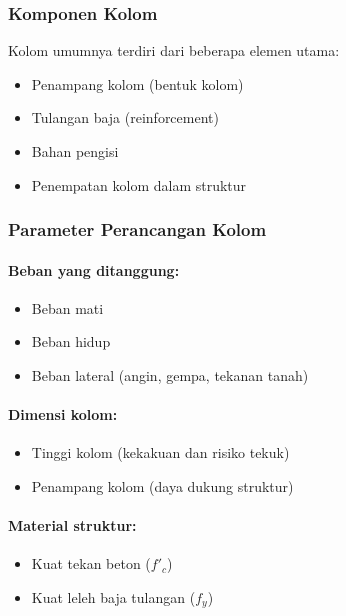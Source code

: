 \documentclass[../main.tex]{subfiles}
\begin{document}
\begin{frame}[t,mycolor=digiPH_leaf,mytitle=standard,dark]
	\frametitle{Komponen Kolom}


	Kolom umumnya terdiri dari beberapa \Huge elemen utama:
	\normalsize
	\begin{itemize}
		\item Penampang kolom (bentuk kolom)
		\item Tulangan baja (reinforcement)
		\item Bahan pengisi
		\item Penempatan kolom dalam struktur
	\end{itemize}
\end{frame}



\begin{frame}[t,mycolor=digiPH_leaf,mytitle=standard,dark]
	\frametitle{Parameter Perancangan Kolom}

	\framesubtitle{Beban yang ditanggung:}

	\begin{itemize}
		\item Beban mati
		\item Beban hidup
		\item Beban lateral (angin, gempa, tekanan tanah)
	\end{itemize}



\end{frame}


\begin{frame}[mytitle=standard,c,mycolor=digiPH_gray,light]\framesubtitle{Dimensi kolom:}

	\begin{itemize}
		\item Tinggi kolom (kekakuan dan risiko tekuk)
		\item Penampang kolom (daya dukung struktur)
	\end{itemize}
\end{frame}

\begin{frame}[mytitle=center,c,mycolor=digiPH_ocean,dark]
	\framesubtitle{Material struktur:}

	\begin{itemize}
		\item Kuat tekan beton ($f'_c$)
		\item Kuat leleh baja tulangan ($f_y$)
	\end{itemize}
\end{frame}
\end{document}
